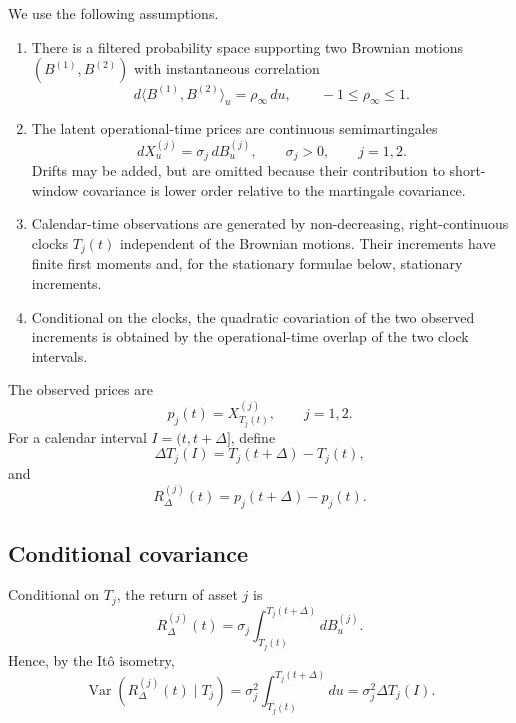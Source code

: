 \documentclass[5p,final]{elsarticle}
\begin{document}
We use the following assumptions.
\begin{enumerate}
\item[(A1)] There is a filtered probability space supporting two Brownian motions $(B^{(1)},B^{(2)})$ with instantaneous correlation
\begin{equation}
 d\langle B^{(1)},B^{(2)}\rangle_u=\rho_\infty\,du,\qquad -1\leq \rho_\infty\leq 1.
\end{equation}
\item[(A2)] The latent operational-time prices are continuous semimartingales
\begin{equation}
 dX^{(j)}_u=\sigma_j\,dB^{(j)}_u,\qquad \sigma_j>0,\qquad j=1,2.
\end{equation}
Drifts may be added, but are omitted because their contribution to short-window covariance is lower order relative to the martingale covariance.
\item[(A3)] Calendar-time observations are generated by non-decreasing, right-continuous clocks $T_j(t)$ independent of the Brownian motions.  Their increments have finite first moments and, for the stationary formulae below, stationary increments.
\item[(A4)] Conditional on the clocks, the quadratic covariation of the two observed increments is obtained by the operational-time overlap of the two clock intervals.
\end{enumerate}

The observed prices are
\begin{equation}
 p_j(t)=X^{(j)}_{T_j(t)},\qquad j=1,2.
\end{equation}
For a calendar interval $I=(t,t+\Delta]$, define
\begin{equation}
 \Delta T_j(I)=T_j(t+\Delta)-T_j(t),
\end{equation}
and
\begin{equation}
 R^{(j)}_\Delta(t)=p_j(t+\Delta)-p_j(t).
\end{equation}

\subsection{Conditional covariance}

Conditional on $T_j$, the return of asset $j$ is
\begin{equation}
 R^{(j)}_\Delta(t)=\sigma_j\int_{T_j(t)}^{T_j(t+\Delta)}dB^{(j)}_u.
\end{equation}
Hence, by the It\^o isometry,
\begin{equation}
 \operatorname{Var}\!\left(R^{(j)}_\Delta(t)\mid T_j\right)
 =\sigma_j^2\int_{T_j(t)}^{T_j(t+\Delta)}du
 =\sigma_j^2\Delta T_j(I).
 \label{eq:sub-cond-var}
\end{equation}
\end{document}
